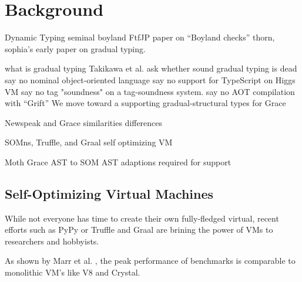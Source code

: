 \section{Background}
\label{sec:background}

\begin{outline}

\1 Dynamic Typing
    \2 seminal 
        \3 boyland FtfJP paper on ``Boyland checks''
        \3 thorn, sophia's early paper on gradual typing.

    \2 what is gradual typing
    \2 Takikawa et al. \cite{Takikawa2016} ask whether sound gradual typing is dead
    \2 \cite{Muehlboeck2017} say no
        \3 nominal object-oriented language
    \2 \cite{Richards2017} say no
        \3 support for TypeScript on Higgs VM
    \2 \cite{Greenman2017} say no
        \3 tag "soundness" on a tag-soundness system.
    \2 \cite{Kuhlenschmidt2018} say no
        \3 AOT compilation with ``Grift''
    \2 We move toward a supporting gradual-structural types for Grace

\1 Newspeak and Grace
    \2 similarities
    \2 differences

\1 SOMns, Truffle, and Graal
    \2 self optimizing VM
    \2 \cite{Wurthinger2013}

\1 Moth
    \2 Grace AST to SOM AST
    \2 adaptions required for support
    \2 \cite{Roberts2017}


\end{outline}


\subsection{Self-Optimizing Virtual Machines}

While not everyone has time to create their own fully-fledged virtual, recent efforts such as PyPy  or Truffle and Graal \cite{Wurthinger2013} are brining the power of VMs to researchers and hobbyists.

As shown by Marr et al. \cite{Marr2016}, the peak performance of benchmarks is comparable to monolithic VM's like V8 and Crystal. 
